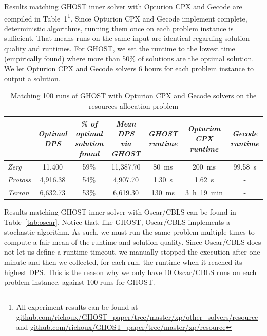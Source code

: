 \documentclass[journal]{IEEEtran}
\newcommand{\ghost}{\textsc{GHOST}\xspace}
\begin{document}
Results matching \ghost inner solver  with Opturion CPX and Gecode are
compiled  in  Table~\ref{tab:SOTA}\footnote{All  experiment results can     be     found     at
  \href{https://github.com/richoux/GHOST\_paper/tree/master/xp/other\_solvers/resource}{github.com/richoux/GHOST\_paper/tree/master/xp/other\_solvers/resource}
  and \href{https://github.com/richoux/GHOST\_paper/tree/master/xp/resource}{github.com/richoux/GHOST\_paper/tree/master/xp/resource}}.
Since Opturion CPX and Gecode
implement complete,  deterministic algorithms,  running them  once on
each  problem instance  is  sufficient. That means  runs on  the  same input  are
identical regarding solution quality and  runtimes. For \ghost, we set
the runtime  to the  lowest time (empirically  found) where  more than
50\% of solutions  are the optimal solution.  We let  Opturion CPX and
Gecode solvers 6 hours for each problem instance to output a solution.

\begin{table}[ht]
  \caption{Matching 100  runs of \ghost  with Opturion CPX  and Gecode
    solvers on the resources allocation problem}
    \label{tab:SOTA}
    \centering
    \begin{tabular}{|l|c|c|c|c|c|c|}
      \cline{2-7}
      \multicolumn{1}{c|}{} &  {\em Optimal  DPS}& {\em \%  of optimal
        solution found}
      & {\em Mean DPS via \ghost}& {\em \ghost runtime}
      & {\em Opturion CPX runtime}& {\em Gecode runtime} \\
      \hline
      {\em Zerg} & 11,400 & 59\% & 11,387.70 & 80~ms & 200~ms & 99.58~s\\
      {\em Protoss} & 4,916.38 & 54\% & 4,907.70 & 1.30~s & 1.62~s & - \\
      {\em Terran} & 6,632.73 & 53\% & 6,619.30 & 130~ms & 3~h~19~min & - \\
      \hline
    \end{tabular}
\end{table}

Results matching \ghost  inner solver with Oscar/CBLS can  be found in
Table~\ref{tab:oscar}. Notice that, like \ghost, Oscar/CBLS implements a stochastic
algorithm.  As such, we  must run the same problem multiple times to compute a 
fair mean of the runtime and solution quality.
Since Oscar/CBLS does not let us define a runtime timeout, we manually stopped
the execution after one minute and then we collected, for each run, the runtime 
when it reached its highest DPS.
This is the reason why we only have 10 Oscar/CBLS runs on each
problem instance, against 100 runs for \ghost.
\end{document}

